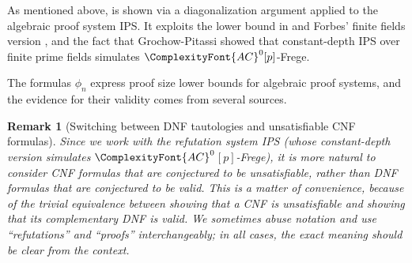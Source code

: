 \documentclass[11pt,letter]{article}
\newtheorem*{remark*}{Remark}
\theoremstyle{remark} %
\newcommand{\ACZ}{\ensuremath{\ComplexityFont{AC}^0}}
\begin{document}

%
%

    

    As mentioned above,   is shown via a diagonalization argument applied to the algebraic proof system IPS. It exploits the lower bound in \cite{LST25} and Forbes' finite fields version  \cite{forbes2024low}, and the fact that Grochow-Pitassi \cite{GP18} showed that constant-depth IPS over finite prime fields simulates $\ACZ[p]$-Frege. 

The formulas $\phi_n$ express proof size lower bounds for algebraic proof systems, and the evidence for their validity comes from several sources.


\begin{remark*}[Switching between DNF tautologies and unsatisfiable CNF formulas]
    Since we work with the \emph{refutation} system IPS (whose constant-depth version simulates \ACZ$[p]$-Frege), it is more natural to consider CNF formulas that are conjectured to be unsatisfiable, rather than DNF formulas that are conjectured to be valid. This is a matter of convenience, because of the trivial equivalence between showing that a CNF is unsatisfiable and showing that its complementary DNF is valid. We sometimes abuse notation and use ``refutations'' and ``proofs'' interchangeably; in all cases, the exact meaning should be clear from the context. 
\end{remark*}
\end{document}
